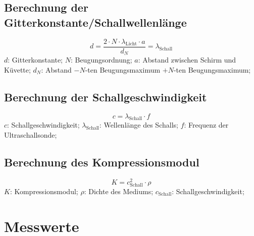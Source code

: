 \documentclass[fontsize=12pt]{scrartcl}
\begin{document}
\subsection{Berechnung der Gitterkonstante/Schallwellenlänge}
\begin{equation}
d=\frac{2 \cdot N \cdot \lambda_{\text{Licht}}\cdot a}{d_N}=\lambda_{\text{Schall}}
\label{welle}
\end{equation}
\noindent
$d$: Gitterkonstante;
$N$: Beugungsordnung;
$a$: Abstand zwischen Schirm und Küvette;
$d_N$: Abstand $-N$-ten Beugungsmaximum $+N$-ten Beugungsmaximum;

\subsection{Berechnung der Schallgeschwindigkeit}
\begin{equation}
c=\lambda_{\text{Schall}} \cdot f
\label{Schall}
\end{equation}
\noindent
$c$: Schallgeschwindigkeit;
$\lambda_{\text{Schall}}$: Wellenlänge des Schalls;
$f$: Frequenz der Ultraschallsonde;

\subsection{Berechnung des Kompressionsmodul}

\begin{equation}
K=c_{\text{Schall}}^2 \cdot \rho 
\label{Komp}
\end{equation}
\noindent
$K$: Kompressionsmodul;
$\rho$: Dichte des Mediums;
$c_{\text{Schall}}$: Schallgeschwindigkeit;

\newpage

\section{ Messwerte}
\end{document}
